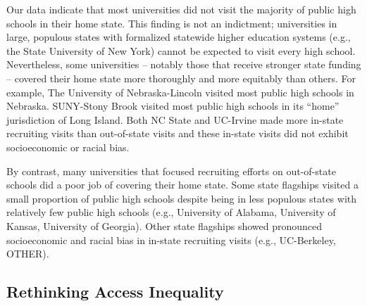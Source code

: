 \documentclass[twoside]{article}
\begin{document}
Our data indicate that most universities did not visit the majority of public high schools in their home state. This finding is not an indictment; universities in large, populous states with formalized statewide higher education systems (e.g., the State University of New York) cannot be expected to visit every high school. Nevertheless, some universities  -- notably those that receive stronger state funding -- covered their home state more thoroughly and more equitably than others.  For example, The University of Nebraska-Lincoln visited most public high schools in Nebraska. SUNY-Stony Brook visited most public high schools in its ``home'' jurisdiction of Long Island. Both NC State and UC-Irvine made more in-state recruiting visits than out-of-state visits and these in-state visits did not exhibit socioeconomic or racial bias.  

By contrast, many universities that focused recruiting efforts on out-of-state schools did a poor job of covering their home state. Some state flagships visited a small proportion of public high schools despite being in less populous states with relatively few public high schools (e.g., University of Alabama, University of Kansas, University of Georgia).  Other state flagships showed pronounced socioeconomic and racial bias in in-state recruiting visits (e.g., UC-Berkeley, OTHER).

\subsection*{Rethinking Access Inequality}
\end{document}
